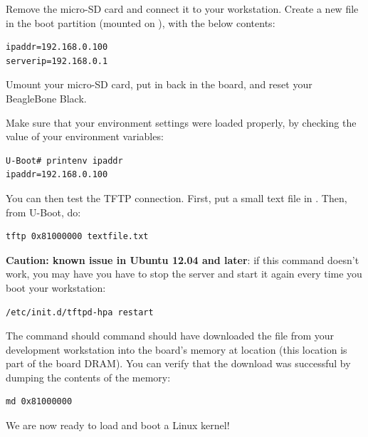 Remove the micro-SD card and connect it to your workstation. Create a
new  file in the boot partition (mounted on
), with the below contents:

\begin{verbatim}
ipaddr=192.168.0.100
serverip=192.168.0.1
\end{verbatim}

Umount your micro-SD card, put in back in the board, and reset your
BeagleBone Black.

Make sure that your environment settings were loaded properly, by
checking the value of your environment variables:

\begin{verbatim}
U-Boot# printenv ipaddr
ipaddr=192.168.0.100
\end{verbatim}

You can then test the TFTP connection.  First, put a small text
file in . Then, from U-Boot, do:

\begin{verbatim}
tftp 0x81000000 textfile.txt
\end{verbatim}

{\bf Caution: known issue in Ubuntu 12.04 and later}: if this command
doesn't work, you may have you have to stop the server and start it
again every time you boot your workstation:

\begin{verbatim}
/etc/init.d/tftpd-hpa restart
\end{verbatim}

The  command should command should have downloaded the
 file from your development workstation into the
board's memory at location  (this location is part of
the board DRAM). You can verify that the download was successful by
dumping the contents of the memory:

\begin{verbatim}
md 0x81000000
\end{verbatim}

We are now ready to load and boot a Linux kernel!
